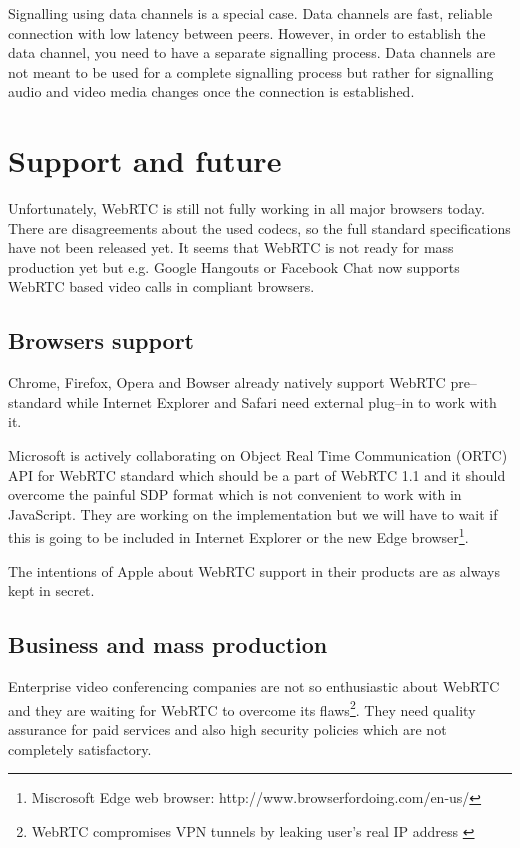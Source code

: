 Signalling using data channels is a special case. Data channels are fast, reliable connection with low latency between peers. However, in order to establish the data channel, you need to have a separate signalling process. Data channels are not meant to be used for a complete signalling process but rather for signalling audio and video media changes once the connection is established. 








\section{Support and future}
Unfortunately, WebRTC is still not fully working in all major browsers today. There are disagreements about the used codecs, so the full standard specifications have not been released yet. It seems that WebRTC is not ready for mass production yet but e.g. Google Hangouts or Facebook Chat now supports WebRTC based video calls in compliant browsers.

\subsection{Browsers support}
Chrome, Firefox, Opera and Bowser already natively support WebRTC pre--standard while Internet Explorer and Safari need external plug--in to work with it.

Microsoft is actively collaborating on Object Real Time Communication (ORTC) API for WebRTC standard which should be a part of WebRTC 1.1 and it should overcome the painful SDP format which is not convenient to work with in JavaScript. They are working on the implementation \cite{ortc} but we will have to wait if this is going to be included in Internet Explorer or the new Edge browser\footnote{Miscrosoft Edge web browser: http://www.browserfordoing.com/en-us/}.

 The intentions of Apple about WebRTC support in their products are as always kept in secret.


\subsection{Business and mass production}
Enterprise video conferencing companies are not so enthusiastic about WebRTC and they are waiting for WebRTC to overcome its flaws\footnote{WebRTC compromises VPN tunnels by leaking user's real IP address \cite{webrtc-ip-leak}}.  They need quality assurance for paid services and also high security policies which are not completely satisfactory.

